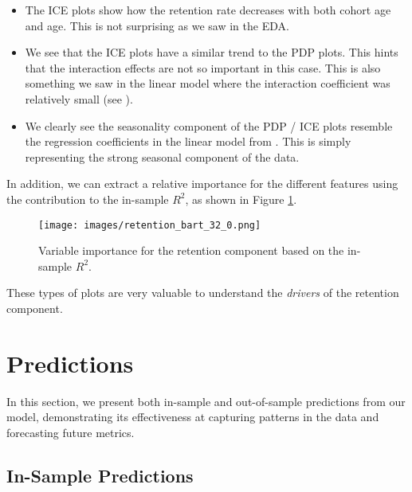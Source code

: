 \documentclass[11pt]{amsart}
\theoremstyle{definition}
\begin{document}
\begin{itemize}
    \item The ICE plots show how the retention rate decreases with both cohort age and age. This is not surprising as we saw in the EDA.
    \item We see that the ICE plots have a similar trend to the PDP plots. This hints that the interaction effects are
          not so important in this case. This is also something we saw in the linear model where the interaction coefficient
          was relatively small (see \cite{orduz_retention}).
    \item We clearly see the seasonality component of the PDP / ICE plots resemble the regression coefficients in the linear
          model from \cite{orduz_retention}. This is simply representing the strong seasonal component of the data.
\end{itemize}

In addition, we can extract a relative importance for the different features using the contribution to the in-sample $R^2$,
as shown in Figure \ref{fig:variable_importance}.

\begin{figure}
    \centering
    \texttt{[image: images/retention\_bart\_32\_0.png]}
    \caption{Variable importance for the retention component based on the in-sample $R^2$.}
    \label{fig:variable_importance}
\end{figure}

These types of plots are very valuable to understand the {\em drivers} of the retention component.

\section{Predictions}

In this section, we present both in-sample and out-of-sample predictions from our model, demonstrating its effectiveness at
capturing patterns in the data and forecasting future metrics.

\subsection{In-Sample Predictions}
\end{document}
